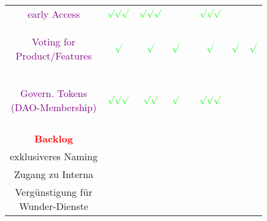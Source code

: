 \begin{tabular}[c]{|c|c|c|c|c|c|c|c|}
\hline
 &  &  &  &  &  &  & \\
\hline
\textcolor{purple}{early Access} & $\color{green} \surd\surd\surd$ & $\color{green} \surd\surd\surd$ &  &  & $\color{green} \surd\surd\surd$ &  & \\
\hline
\textcolor{purple}{\parbox{2.8cm}{Voting for \\ Product/Features}} & $\color{green} \surd$ & $\color{green} \surd$ & $\color{green} \surd$ &  & $\color{green} \surd$ & $\color{green} \surd$ & $\color{green} \surd$ \\
\hline
\textcolor{purple}{\parbox{2.8cm}{Govern. Tokens \\ (DAO-Membership)}} & $\color{green} \surd\surd\surd$ & $\color{green} \surd\surd$ &   $\color{green} \surd$ &  & $\color{green} \surd\surd\surd$ &  & \\
\hline
 &  &  &  &  &  &  & \\
\hline
\textcolor{red}{\textbf{Backlog}} &  &  &  &  &  &  & \\
\hline
exklusiveres Naming &  &  &  &  &  &  & \\
\hline
Zugang zu Interna &  &  &  &  &  &  & \\
\hline
\parbox{3.0cm}{Vergünstigung für \\ Wunder-Dienste} &  &  &  &  &  &  & \\
\hline
\end{tabular}\vspace*{0.3cm}\\

\vspace{0.5cm}